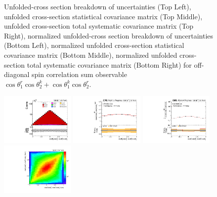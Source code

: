 \begin{refsection}
\begin{figure}[htb]
\begin{center}
\caption{Unfolded-cross section breakdown of uncertainties (Top Left), unfolded cross-section statistical covariance matrix (Top Middle), unfolded cross-section total systematic covariance matrix (Top Right), normalized unfolded-cross section breakdown of uncertainties (Bottom Left), normalized unfolded cross-section statistical covariance matrix (Bottom Middle), normalized unfolded cross-section total systematic covariance matrix (Bottom Right) for off-diagonal spin correlation sum observable $\cos\theta_{1}^{r}\cos\theta_{2}^{k}+\cos\theta_{1}^{k}\cos\theta_{2}^{r}$.}
\label{fig:c_Prk_uncertainties}
\end{center}
\end{figure}
\clearpage
\begin{figure}[htb]
\begin{center}
 \includegraphics[width=0.32\textwidth]{fig_fullRun2UL/controlplots/combined/Hyp_LLBarCMrk.pdf}
 \includegraphics[width=0.32\textwidth]{fig_fullRun2UL/unfolding/combined/UnfoldedResults_c_Mrk.pdf}
 \includegraphics[width=0.32\textwidth]{fig_fullRun2UL/unfolding/combined/UnfoldedResultsNorm_c_Mrk.pdf} \\
 \includegraphics[width=0.32\textwidth]{fig_fullRun2UL/unfolding/combined/ResponseMatrix_c_Mrk.pdf}

\end{center}
\end{figure}
\end{refsection}
